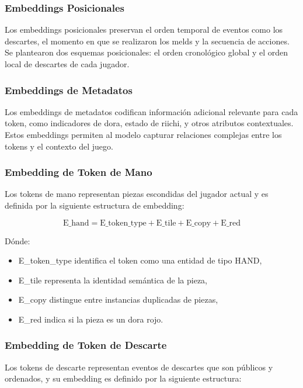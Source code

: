 \subsubsection{Embeddings Posicionales}

Los embeddings posicionales preservan el orden temporal de eventos como los descartes, el momento en que se realizaron los melds y la secuencia de acciones. Se plantearon dos esquemas posicionales: el orden cronológico global y el orden local de descartes de cada jugador.

\subsubsection{Embeddings de Metadatos}

Los embeddings de metadatos codifican información adicional relevante para cada token, como indicadores de dora, estado de riichi, y otros atributos contextuales. Estos embeddings permiten al modelo capturar relaciones complejas entre los tokens y el contexto del juego.

\subsubsection{Embedding de Token de Mano}

Los tokens de mano representan piezas escondidas del jugador actual y es definida por la siguiente estructura de embedding:


$$\text{E\_hand} = \text{E\_token\_type} + \text{E\_tile} + \text{E\_copy} + \text{E\_red}$$

Dónde:

\begin{itemize}
  \item E\_token\_type identifica el token como una entidad de tipo HAND,
  \item E\_tile representa la identidad semántica de la pieza,
  \item E\_copy distingue entre instancias duplicadas de piezas,
  \item E\_red indica si la pieza es un dora rojo.
\end{itemize}

\subsubsection{Embedding de Token de Descarte}

Los tokens de descarte representan eventos de descartes que son públicos y ordenados, y su embedding es definido por la siguiente estructura:

